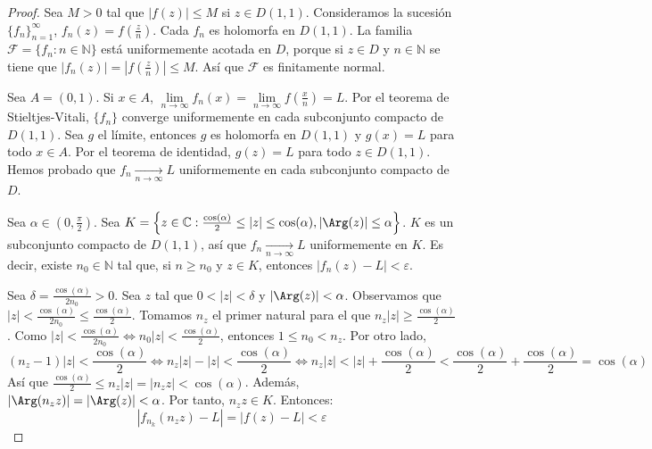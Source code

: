\begin{proof}
    Sea $M > 0$ tal que $|f(z)| \leq M$ si $z \in D(1, 1)$.
    Consideramos la sucesión $\{f_n\}_{n=1}^\infty$, $f_n(z) = f\left(\frac{z}{n}\right)$.
    Cada $f_n$ es holomorfa en $D(1, 1)$.
    La familia $\mathcal{F} = \{f_n : n \in \mathbb{N}\}$ está uniformemente acotada en $D$, porque si $z \in D$ y $n \in \mathbb{N}$ se tiene que $|f_n(z)| = \left|f\left(\frac{z}{n}\right)\right| \leq M$.
    Así que $\mathcal{F}$ es finitamente normal.

    Sea $A = (0, 1)$.
    Si $x \in A$, $\lim\limits_{n \to \infty} f_n(x) = \lim\limits_{n \to \infty} f\left(\frac{x}{n}\right) = L$.
    Por el teorema de Stieltjes-Vitali, $\{f_n\}$ converge uniformemente en cada subconjunto compacto de $D(1, 1)$.
    Sea $g$ el límite, entonces $g$ es holomorfa en $D(1, 1)$ y $g(x) = L$ para todo $x \in A$.
    Por el teorema de identidad, $g(z) = L$ para todo $z \in D(1, 1)$.
    Hemos probado que $f_n \xrightarrow[n \to \infty]{} L$ uniformemente en cada subconjunto compacto de $D$.

    Sea $\alpha \in (0, \frac{\pi}{2})$.
    Sea $K = \left\{z \in \mathbb{C} : \frac{\cos(\alpha)}{2} \leq |z| \leq \cos(\alpha), |\Arg(z)| \leq \alpha\right\}$.
    $K$ es un subconjunto compacto de $D(1, 1)$, así que $f_n \xrightarrow[n \to \infty]{} L$ uniformemente en $K$.
    Es decir, existe $n_0 \in \mathbb{N}$ tal que, si $n \geq n_0$ y $z \in K$, entonces $|f_n(z)-L| < \varepsilon$.

    Sea $\delta = \frac{\cos(\alpha)}{2n_0} > 0$.
    Sea $z$ tal que $0 < |z| < \delta$ y $|\Arg(z)| < \alpha$.
    Observamos que $|z| < \frac{\cos(\alpha)}{2n_0} \leq \frac{\cos(\alpha)}{2}$.
    Tomamos $n_z$ el primer natural para el que $n_z|z| \geq \frac{\cos(\alpha)}{2}$.
    Como $|z| < \frac{\cos(\alpha)}{2n_0} \Leftrightarrow n_0|z| < \frac{\cos(\alpha)}{2}$, entonces $1 \leq n_0 < n_z$.
    Por otro lado,
    $$(n_z-1)|z| < \frac{\cos(\alpha)}{2} \Leftrightarrow n_z|z| - |z| < \frac{\cos(\alpha)}{2} \Leftrightarrow n_z|z| < |z| + \frac{\cos(\alpha)}{2} < \frac{\cos(\alpha)}{2} + \frac{\cos(\alpha)}{2} = \cos(\alpha)$$
    Así que $\frac{\cos(\alpha)}{2} \leq n_z|z| = |n_zz| < \cos(\alpha)$.
    Además, $|\Arg(n_zz)| = |\Arg(z)| < \alpha$.
    Por tanto, $n_zz \in K$.
    Entonces:
    $$|f_{n_k}(n_zz) - L| = |f(z) - L| < \varepsilon$$
\end{proof}

